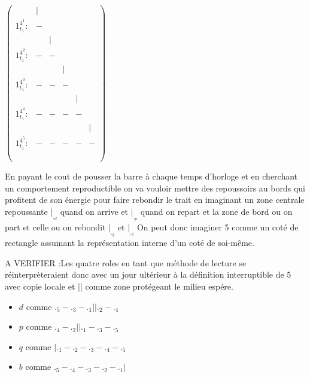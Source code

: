 \documentclass{article}
\begin{document}
$ \left({ \scriptscriptstyle\begin{matrix}

  &  | &  &   &   &   \\
  1_{t_1}^{4^1}:& - &   &   &   &   \\
  &   & | &   &   &   \\
  1_{t_1}^{4^2}:& - & - &   &   &   \\
  &   &   & | &   &   \\
  1_{t_1}^{4^3}:& - & - & - &   &   \\
  &   &   &   & | &   \\
  1_{t_1}^{4^4}:& - & - & - & - &   \\
  &   &   &   &   & | \\
  1_{t_1}^{4^5}:& - & - & - & - & - \\
  &   &   &   &   &   \\
  &   &   &   &   &   \\
\end{matrix}}   \right)$

En payant le cout de pousser la barre à chaque temps d'horloge et en cherchant un comportement reproductible on va vouloir mettre des repoussoirs au bords qui profitent de son énergie pour faire rebondir le trait 
en imaginant un zone centrale repoussante $|_{._d}$ quand on arrive et $|_{._p}$ quand on repart et la zone de bord ou on part et celle ou on rebondit $|_{._q}$ et $|_{._b}$
On peut donc imaginer  5 comme un coté de rectangle assumant la représentation interne d'un coté de soi-même.


A VERIFIER :Les quatre roles  en tant que méthode  de lecture se réinterprèteraient donc avec un jour ultérieur à la définition interruptible  de 5 avec copie locale et || comme zone protégeant le milieu espére.%

 \begin{itemize}
 \item $d$   comme    $._5-._3-._1 ||._2-._4$ 
 \item $p$ comme     $._4-._2||._1-._3-._5$ 
 \item $q$ comme     $|._1-._2-._3-._4-._5$ 
 \item $b$ comme     $._5-._4-._3-._2-._1|$ 
 \end{itemize} 
 
  
\end{document}
